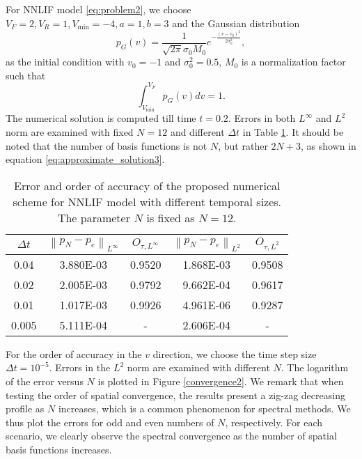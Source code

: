 For NNLIF model \eqref{eq:problem2}, we choose $V_F=2,V_R=1,V_{\text{min}}=-4,a=1, b=3$ and the Gaussian distribution
\begin{equation}
    p_G(v)=\frac{1}{\sqrt{2 \pi} \sigma_{0} M_0} e^{-\frac{\left(v-v_{0}\right)^{2}}{2 \sigma_{0}^{2}}},
\end{equation}
as the initial condition with $v_0=-1$ and $\sigma_0^2=0.5$, $M_0$ is a normalization factor such that
\begin{equation}
    \int_{V_{\text{min}}}^{V_F} p_G(v) dv=1.
\end{equation}
 The numerical solution is computed till time $t=0.2$. Errors in both $L^{\infty}$ and $L^2$ norm are examined with fixed $N=12$ and different $\Delta t$ in Table \ref{convergence1}. It should be noted that the number of basis functions is not $N$, but rather $2N+3$, as shown in equation \eqref{eq:approximate_solution3}. 
\begin{table}[!htb]
	\centering
	\begin{tabularx}{10cm}{ccccc}
	\toprule
	$\Delta t$ & $\left\| p_N-p_e \right\|_{L^{\infty}}$& {$O_{\tau,L^{\infty}}$}& $\left\| p_N-p_e \right\|_{L^2}$& {$O_{\tau,L^2}$}\\ 
	\midrule
	0.04 & 3.880E-03 &0.9520 & 1.868E-03 &0.9508 \\
	0.02 & 2.005E-03 & 0.9792 & 9.662E-04 &0.9617 \\
	0.01 & 1.017E-03 & 0.9926 &4.961E-06&0.9287 \\
    0.005 & 5.111E-04 & - &2.606E-04& - \\
	\bottomrule
    \end{tabularx}
    \caption{Error and order of accuracy of the proposed numerical scheme for NNLIF model with different temporal sizes. The parameter $N$ is fixed as $N=12$.}
    \label{convergence1}
\end{table}

For the order of accuracy in the $v$ direction, we choose the time step size $\Delta t=10^{-5}$. Errors in the $L^2$ norm are examined with different $N$. The logarithm of the error versus $N$ is plotted in Figure \ref{convergence2}. We remark that when testing the order of spatial convergence, the results present a zig-zag decreasing profile as $N$ increases, which is a common phenomenon for spectral methods. We thus plot the errors for odd and even numbers of $N$, respectively. For each scenario, we clearly observe the spectral convergence as the number of spatial basis functions increases.


